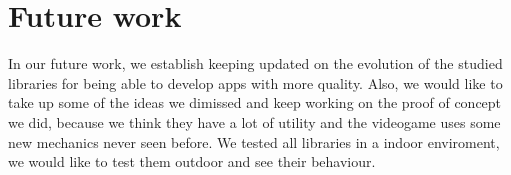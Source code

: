 \section*{Future work}
In our future work, we establish keeping updated on the evolution of the studied libraries for being able to develop apps with more quality. Also, we would like to take up some of the ideas we dimissed and keep working on the proof of concept we did, because we think they have a lot of utility and the videogame uses some new mechanics never seen before. We tested all libraries in a indoor enviroment, we would like to test them outdoor and see their behaviour.
\noindent